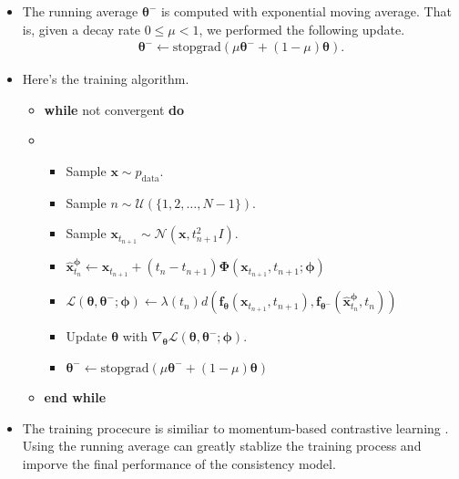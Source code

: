 \documentclass[10pt]{article}
\newcommand{\ve}[1]{\mathbf{#1}}
\newcommand{\ves}[1]{\boldsymbol{#1}}
\newcommand{\mrm}[1]{\mathrm{#1}}
\newcommand{\mcal}[1]{\mathcal{#1}}
\newcommand{\data}{\mathrm{data}}
\begin{document}
\begin{itemize}
  \item The running average $\ves{\theta}^-$ is computed with exponential moving average. That is, given a decay rate $0 \leq \mu < 1$, we performed the following update.
  \begin{align*}
    \ves{\theta}^- \leftarrow \mrm{stopgrad}(\mu\ves{\theta}^- + (1 - \mu)\ves{\theta}).
  \end{align*}

  \item Here's the training algorithm.
  \begin{itemize}
    \item[] {\bf while} not convergent {\bf do}
    \item[] \begin{itemize}
      \item[] Sample $\ve{x} \sim p_{\data}$.
      \item[] Sample $n \sim \mcal{U}(\{ 1, 2, \dotsc, N-1\})$.
      \item[] Sample $\ve{x}_{t_{n+1}} \sim \mcal{N}(\ve{x}, t_{n+1}^2 I)$.
      \item[] $\hat{\ve{x}}_{t_n}^{\ves{\phi}} \leftarrow \ve{x}_{t_{n+1}} + (t_{n} - t_{n+1})\ves{\Phi}(\ve{x}_{t_{n+1}}, t_{n+1}; \ves{\phi})$
      \item[] $\mcal{L}(\ves{\theta},\ves{\theta}^-;\ves{\phi}) \leftarrow \lambda(t_n) d(\ve{f}_{\ves{\theta}}(\ve{x}_{t_{n+1}}, t_{n+1}), \ves{f}_{\ves{\theta}^-}(\hat{\ve{x}}_{t_n}^{\ves{\phi}}, t_{n}))$
      \item[] Update $\ves{\theta}$ with $\nabla_{\ves{\theta}} \mcal{L}(\ves{\theta},\ves{\theta}^-;\ves{\phi})$.
      \item[] $\ves{\theta}^{-} \leftarrow \mrm{stopgrad}(\mu \ves{\theta}^- + (1-\mu)\ves{\theta})$
    \end{itemize}
    \item[] {\bf end while}
  \end{itemize}

  \item The training procecure is similiar to momentum-based contrastive learning \cite{Grill:2020, He:2019}. Using the running average can greatly stablize the training process and imporve the final performance of the consistency model.  
  

\end{itemize}
\end{document}
